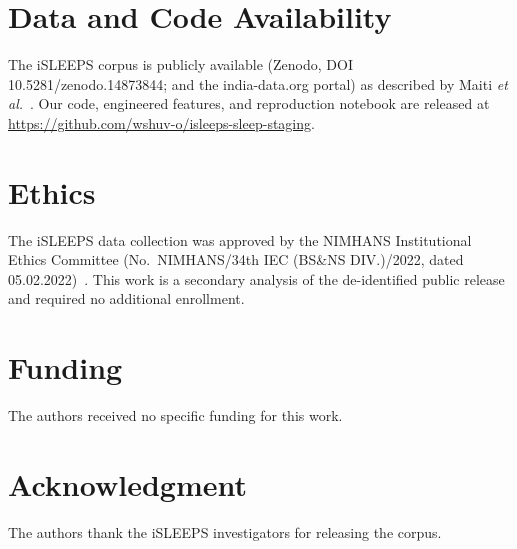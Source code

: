 \documentclass[preprint,12pt]{elsarticle}
\begin{document}
\section*{Data and Code Availability}
The iSLEEPS corpus is publicly available (Zenodo, DOI 10.5281/zenodo.14873844; and the
india-data.org portal) as described by Maiti \textit{et al.}~\cite{maiti2026isleeps}. Our
code, engineered features, and reproduction notebook are released at
\url{https://github.com/wshuv-o/isleeps-sleep-staging}.

\section*{Ethics}
The iSLEEPS data collection was approved by the NIMHANS Institutional Ethics Committee
(No.\ NIMHANS/34th IEC (BS\&NS DIV.)/2022, dated 05.02.2022)~\cite{maiti2026isleeps}. This work
is a secondary analysis of the de-identified public release and required no additional
enrollment.

\section*{Funding}
The authors received no specific funding for this work.

\section*{Acknowledgment}
The authors thank the iSLEEPS investigators for releasing the corpus.



\end{document}
